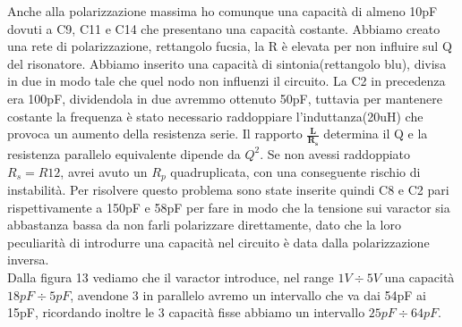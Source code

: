 \documentclass{article}
\begin{document}
Anche alla polarizzazione massima ho comunque una capacità di almeno 10pF dovuti  a C9, C11 e C14 che presentano una capacità costante.
Abbiamo creato una rete di polarizzazione, rettangolo fucsia, la R è elevata per non influire sul Q del risonatore.
Abbiamo inserito una capacità di sintonia(rettangolo blu), divisa in due in modo tale che quel nodo non influenzi il circuito.
La C2 in precedenza era 100pF, dividendola in due avremmo ottenuto 50pF, tuttavia per mantenere costante la frequenza è stato necessario raddoppiare l'induttanza(20uH) che provoca un aumento della resistenza serie.
Il rapporto \LARGE$\bm{\frac{L}{R_s}}$ \normalsize determina il Q e la resistenza parallelo equivalente dipende da $Q^2$.
Se non avessi raddoppiato $R_s=R12$, avrei avuto un $R_p$ quadruplicata, con una conseguente rischio di instabilità.
Per risolvere questo problema sono state inserite quindi C8 e C2 pari rispettivamente a 150pF e 58pF per fare in modo che la tensione sui varactor sia abbastanza bassa da non farli polarizzare direttamente, dato che la loro peculiarità di introdurre una capacità nel circuito è data dalla polarizzazione inversa.\\Dalla figura 13 vediamo che il varactor introduce, nel range $1V \div 5V$ una capacità $18pF \div 5pF$, avendone 3 in parallelo avremo un intervallo che va dai 54pF ai 15pF, ricordando inoltre le 3 capacità fisse abbiamo un intervallo $25pF \div 64pF$.

\newpage
\end{document}
